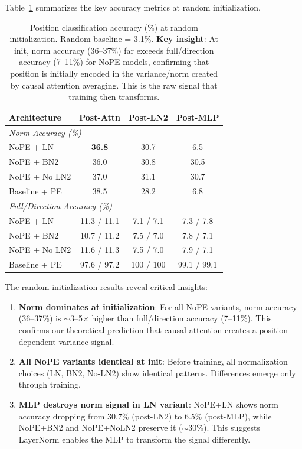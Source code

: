 \documentclass[11pt]{article}
\begin{document}
Table~\ref{tab:sample-level-random} summarizes the key accuracy metrics at random initialization.

\begin{table}[htbp]
\centering
\small
\begin{tabular}{lccc}
\toprule
\textbf{Architecture} & \textbf{Post-Attn} & \textbf{Post-LN2} & \textbf{Post-MLP} \\
\midrule
\multicolumn{4}{l}{\textit{Norm Accuracy (\%)}} \\
NoPE + LN & \textbf{36.8} & 30.7 & 6.5 \\
NoPE + BN2 & 36.0 & 30.8 & 30.5 \\
NoPE + No LN2 & 37.0 & 31.1 & 30.7 \\
Baseline + PE & 38.5 & 28.2 & 6.8 \\
\midrule
\multicolumn{4}{l}{\textit{Full/Direction Accuracy (\%)}} \\
NoPE + LN & 11.3 / 11.1 & 7.1 / 7.1 & 7.3 / 7.8 \\
NoPE + BN2 & 10.7 / 11.2 & 7.5 / 7.0 & 7.8 / 7.1 \\
NoPE + No LN2 & 11.6 / 11.3 & 7.5 / 7.0 & 7.9 / 7.1 \\
Baseline + PE & 97.6 / 97.2 & 100 / 100 & 99.1 / 99.1 \\
\bottomrule
\end{tabular}
\caption{Position classification accuracy (\%) at random initialization. Random baseline = 3.1\%. \textbf{Key insight}: At init, norm accuracy (36--37\%) far exceeds full/direction accuracy (7--11\%) for NoPE models, confirming that position is initially encoded in the variance/norm created by causal attention averaging. This is the raw signal that training then transforms.}
\label{tab:sample-level-random}
\end{table}

The random initialization results reveal critical insights:

\begin{enumerate}
    \item \textbf{Norm dominates at initialization}: For all NoPE variants, norm accuracy (36--37\%) is $\sim$3--5$\times$ higher than full/direction accuracy (7--11\%). This confirms our theoretical prediction that causal attention creates a position-dependent variance signal.
    
    \item \textbf{All NoPE variants identical at init}: Before training, all normalization choices (LN, BN2, No-LN2) show identical patterns. Differences emerge only through training.
    
    \item \textbf{MLP destroys norm signal in LN variant}: NoPE+LN shows norm accuracy dropping from 30.7\% (post-LN2) to 6.5\% (post-MLP), while NoPE+BN2 and NoPE+NoLN2 preserve it ($\sim$30\%). This suggests LayerNorm enables the MLP to transform the signal differently.
\end{enumerate}
\end{document}
